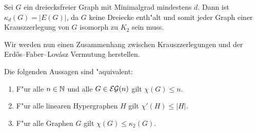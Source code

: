\begin{example}
  Sei $G$ ein dreiecksfreier Graph mit Minimalgrad mindestens $d$. Dann ist $\kappa_{d}(G) = |E(G)|$, da $G$ keine Dreiecke enth"alt und somit jeder Graph einer Krauszzerlegung von $G$ isomorph zu $K_{2}$ sein muss. 
\end{example}

Wir werden nun einen Zusammenhang zwischen Krauszzerlegungen und der Erd\H{o}s--Faber--Lov\'asz Vermutung herstellen.

\begin{theorem}
  Die folgenden Aussagen sind "aquivalent:
  \begin{enumerate}[label=\rm{(\alph*)}]
    \item F"ur alle $n\in{\mathbb{N}}$ und alle $G\in{\cal EG}(n)$ gilt $\chi(G) \leq n$.
    \item F"ur alle linearen Hypergraphen $H$ gilt $\chi'(H) \leq |H|$.
    \item F"ur alle Graphen $G$ gilt $\chi(G) \leq \kappa_{2}(G)$.
  \end{enumerate}
  \label{thm:equivefl}
\end{theorem}


